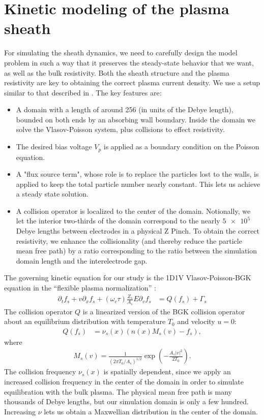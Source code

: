 \documentclass{article}
\begin{document}
\section{Kinetic modeling of the plasma sheath}

For simulating the sheath dynamics, we need to carefully design the model problem in such a way
that it preserves the steady-state behavior that we want, as well as the bulk resistivity.
Both the sheath structure and the plasma resistivity are key to obtaining the correct plasma current density.
We use a setup similar to that described in \cite{skolarContinuumKineticInvestigation2023}. The key features are:
\begin{itemize}
    \item A domain with a length of around 256 (in units of the Debye length), bounded on both ends by an absorbing wall boundary.
        Inside the domain we solve the Vlasov-Poisson system, plus collisions to effect resistivity.
    \item The desired bias voltage $V_p$ is applied as a boundary condition on the Poisson equation.
    \item A "flux source term", whose role is to replace the particles lost to the walls, is applied to keep the total particle
        number nearly constant. This lets us achieve a steady state solution.
    \item A collision operator is localized to the center of the domain. Notionally, we let the interior two-thirds of the domain
        correspond to the nearly $\num{5e5}$ Debye lengths between electrodes in a physical Z Pinch.
        To obtain the correct resistivity, we enhance the collisionality (and thereby reduce the particle mean free path) by a
        ratio corresponding to the ratio between the simulation domain length and the interelectrode gap.
\end{itemize}


The governing kinetic equation for our study is the 1D1V Vlasov-Poisson-BGK equation in
the ``flexible plasma normalization'' \cite{millerMultispecies13momentModel2016}:
\begin{align}
    \label{eqn:vlasov_bgk}
    \partial_t f_s + v \partial_x f_s + (\omega_c \tau) \frac{Z_s}{A_s} E \partial_v f_s &= Q(f_s) + \Gamma_s
\end{align}
The collision operator $Q$ is a linearized version of the BGK collision operator about an equilibrium
distribution with temperature $T_{0}$ and velocity $u = 0$:
\begin{align*}
    Q(f_s) &= \nu_s(x) (n(x) M_s(v) - f_s),
\end{align*}
where
\begin{align*}
    M_s(v) = \frac{1}{(2\pi T_0/A_s)^{1/2}} \exp \left( -\frac{A_s|v|^2}{2T_0} \right).
\end{align*}
The collision frequency $\nu_s(x)$ is spatially dependent, since we apply an increased collision frequency in the center of the domain
in order to simulate equilibration with the bulk plasma.
The physical mean free path is many thousands of Debye lengths, but our simulation domain is only a few hundred.
Increasing $\nu$ lets us obtain a Maxwellian distribution in the center of the domain.
\end{document}
